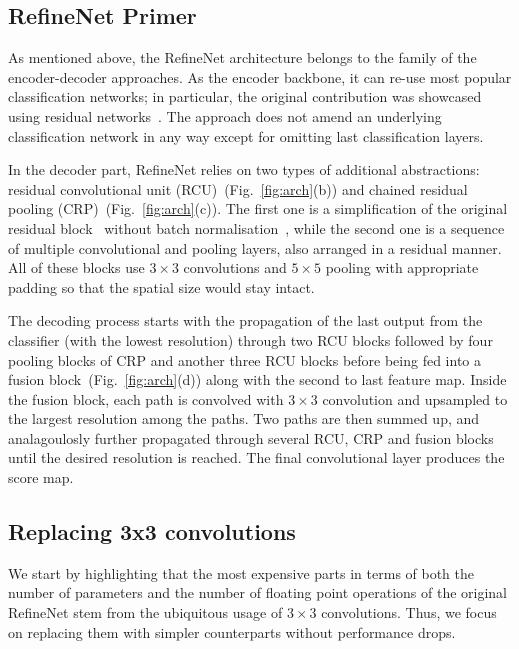 \documentclass{bmvc2k}
\begin{document}
\subsection{RefineNet Primer}

As mentioned above, the RefineNet architecture belongs to the family of the encoder-decoder approaches. As the encoder backbone, it can re-use most popular classification networks; in particular, the original contribution was showcased using residual networks~\cite{HeZRS16}. The approach does not amend an underlying classification network in any way except for omitting last classification layers.

In the decoder part, RefineNet relies on two types of additional abstractions: residual convolutional unit (RCU)~(Fig.~\ref{fig:arch}(b)) and chained residual pooling (CRP)~(Fig.~\ref{fig:arch}(c)). The first one is a simplification of the original residual block~\cite{HeZRS16} without batch normalisation~\cite{IoffeS15}, while the second one is a sequence of multiple convolutional and pooling layers, also arranged in a residual manner. All of these blocks use $3\times3$ convolutions and $5\times5$ pooling with appropriate padding so that the spatial size would stay intact.

The decoding process starts with the propagation of the last output from the classifier (with the lowest resolution) through two RCU blocks followed by four pooling blocks of CRP and another three RCU blocks before being fed into a fusion block~(Fig.~\ref{fig:arch}(d)) along with the second to last feature map. Inside the fusion block, each path is convolved with $3\times3$ convolution and upsampled to the largest resolution among the paths. Two paths are then summed up, and analagoulosly further propagated through several RCU, CRP and fusion blocks until the desired resolution is reached. The final convolutional layer produces the score map.

\subsection{Replacing 3x3 convolutions}We start by highlighting that the most expensive parts in terms of both the number of parameters and the number of floating point operations of the original RefineNet stem from the ubiquitous usage of $3\times3$ convolutions. Thus, we focus on replacing them with simpler counterparts without performance drops.
\end{document}
